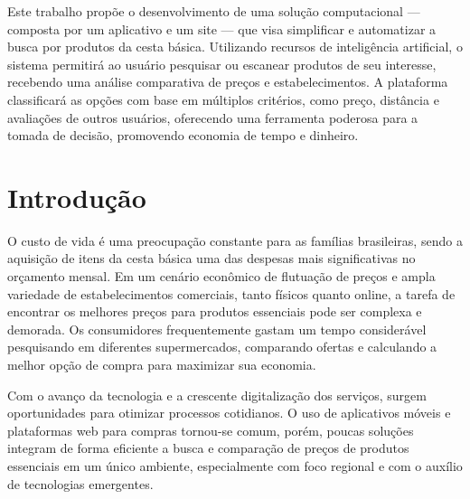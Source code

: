 \documentclass[
  article,      %
  a4paper,      %
  12pt,         %
  oneside,      %
  fleqn         %
]{abntex2}
\begin{document}
\pretextual

\begin{paginadetitulo}
    \begin{ambienteresumo}
        Este trabalho propõe o desenvolvimento de uma solução computacional — composta por um aplicativo e um site — que visa simplificar e automatizar a busca por produtos da cesta básica. Utilizando recursos de inteligência artificial, o sistema permitirá ao usuário pesquisar ou escanear produtos de seu interesse, recebendo uma análise comparativa de preços e estabelecimentos. A plataforma classificará as opções com base em múltiplos critérios, como preço, distância e avaliações de outros usuários, oferecendo uma ferramenta poderosa para a tomada de decisão, promovendo economia de tempo e dinheiro.
    \end{ambienteresumo}
\end{paginadetitulo}

\textual
\newpage

\section{Introdução}

O custo de vida é uma preocupação constante para as famílias brasileiras, sendo a aquisição de itens da cesta básica uma das despesas mais significativas no orçamento mensal. Em um cenário econômico de flutuação de preços e ampla variedade de estabelecimentos comerciais, tanto físicos quanto online, a tarefa de encontrar os melhores preços para produtos essenciais pode ser complexa e demorada. Os consumidores frequentemente gastam um tempo considerável pesquisando em diferentes supermercados, comparando ofertas e calculando a melhor opção de compra para maximizar sua economia.

Com o avanço da tecnologia e a crescente digitalização dos serviços, surgem oportunidades para otimizar processos cotidianos. O uso de aplicativos móveis e plataformas web para compras tornou-se comum, porém, poucas soluções integram de forma eficiente a busca e comparação de preços de produtos essenciais em um único ambiente, especialmente com foco regional e com o auxílio de tecnologias emergentes.
\end{document}
